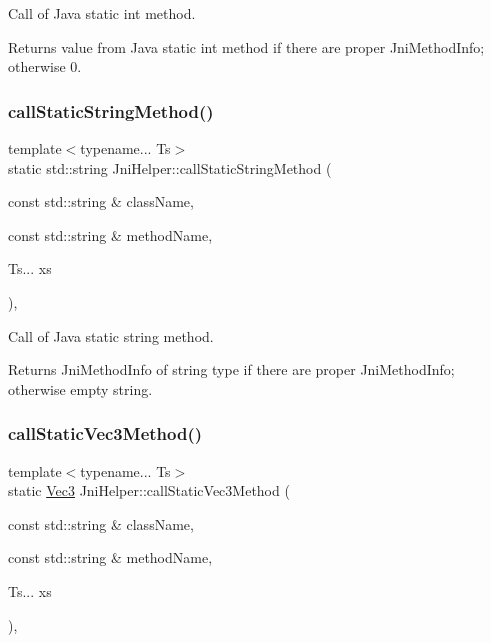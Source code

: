 Call of Java static int method. 

\begin{DoxyReturn}{Returns}
value from Java static int method if there are proper Jni\+Method\+Info; otherwise 0. 
\end{DoxyReturn}
\mbox{\label{classJniHelper_a1b3bdf85d19fe5e8a54dff67a42720da}} 
\subsubsection{\texorpdfstring{call\+Static\+String\+Method()}{callStaticStringMethod()}}
{\footnotesize\ttfamily template$<$typename... Ts$>$ \\
static std\+::string Jni\+Helper\+::call\+Static\+String\+Method (\begin{DoxyParamCaption}\item[{const std\+::string \&}]{class\+Name,  }\item[{const std\+::string \&}]{method\+Name,  }\item[{Ts...}]{xs }\end{DoxyParamCaption})\hspace{0.3cm}{\ttfamily [inline]}, {\ttfamily [static]}}



Call of Java static string method. 

\begin{DoxyReturn}{Returns}
Jni\+Method\+Info of string type if there are proper Jni\+Method\+Info; otherwise empty string. 
\end{DoxyReturn}
\mbox{\label{classJniHelper_a9388a9c8636e4583b73ba913dfae9751}} 
\subsubsection{\texorpdfstring{call\+Static\+Vec3\+Method()}{callStaticVec3Method()}}
{\footnotesize\ttfamily template$<$typename... Ts$>$ \\
static \hyperlink{classVec3}{Vec3} Jni\+Helper\+::call\+Static\+Vec3\+Method (\begin{DoxyParamCaption}\item[{const std\+::string \&}]{class\+Name,  }\item[{const std\+::string \&}]{method\+Name,  }\item[{Ts...}]{xs }\end{DoxyParamCaption})\hspace{0.3cm}{\ttfamily [inline]}, {\ttfamily [static]}}



